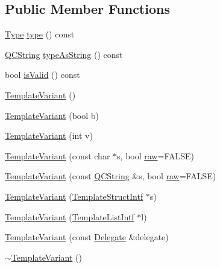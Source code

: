 \subsection*{Public Member Functions}
\begin{DoxyCompactItemize}
\item 
\mbox{\hyperlink{class_template_variant_a4c0d322ba971480bfbd2a8f418eadc81}{Type}} \mbox{\hyperlink{class_template_variant_a44564decc01226f38116fe78461bb912}{type}} () const
\item 
\mbox{\hyperlink{class_q_c_string}{Q\+C\+String}} \mbox{\hyperlink{class_template_variant_aa3367e7e77d68c0164f83c951906a608}{type\+As\+String}} () const
\item 
bool \mbox{\hyperlink{class_template_variant_ad3f1a29e8b62970abcfac5823e0a0177}{is\+Valid}} () const
\item 
\mbox{\hyperlink{class_template_variant_a56e1f12ff7f2fc2f9c5d269495161201}{Template\+Variant}} ()
\item 
\mbox{\hyperlink{class_template_variant_ae41a75ce11e1187f0934f26bb78f8bd2}{Template\+Variant}} (bool b)
\item 
\mbox{\hyperlink{class_template_variant_a374d1ccdd4841ab6ddc7fa7cd23e69fd}{Template\+Variant}} (int v)
\item 
\mbox{\hyperlink{class_template_variant_a1a57277efae2fbb361f65c2992f61c6e}{Template\+Variant}} (const char $\ast$s, bool \mbox{\hyperlink{class_template_variant_a17a2ee68f05645c2da3180259f12953a}{raw}}=F\+A\+L\+SE)
\item 
\mbox{\hyperlink{class_template_variant_af81e60a076fd6bb5fec55ee424797a85}{Template\+Variant}} (const \mbox{\hyperlink{class_q_c_string}{Q\+C\+String}} \&s, bool \mbox{\hyperlink{class_template_variant_a17a2ee68f05645c2da3180259f12953a}{raw}}=F\+A\+L\+SE)
\item 
\mbox{\hyperlink{class_template_variant_a700516fd1c548baa21a65fd11b25e2b8}{Template\+Variant}} (\mbox{\hyperlink{class_template_struct_intf}{Template\+Struct\+Intf}} $\ast$s)
\item 
\mbox{\hyperlink{class_template_variant_a4e55aab3ce72fb006fa4e36b16bec0b6}{Template\+Variant}} (\mbox{\hyperlink{class_template_list_intf}{Template\+List\+Intf}} $\ast$l)
\item 
\mbox{\hyperlink{class_template_variant_a38cceb9da15e4edeb649545edbb647cc}{Template\+Variant}} (const \mbox{\hyperlink{class_template_variant_1_1_delegate}{Delegate}} \&delegate)
\item 
\mbox{\hyperlink{class_template_variant_a8fa8f46048c3cde3c719932060101a0a}{$\sim$\+Template\+Variant}} ()

\end{DoxyCompactItemize}
